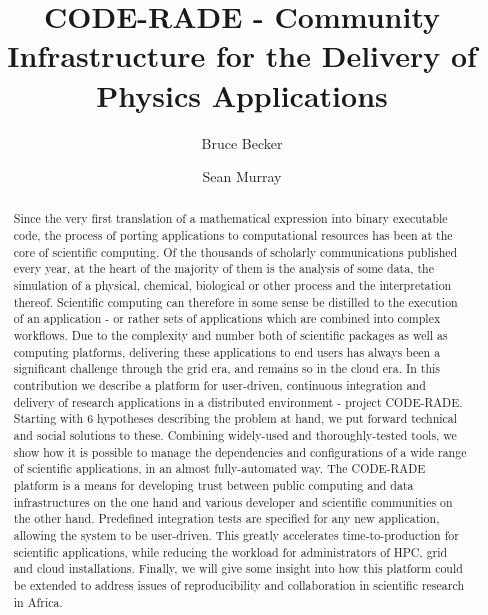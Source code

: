 \documentclass[a4paper]{jpconf}
\begin{document}
\title{CODE-RADE - Community Infrastructure for the Delivery of Physics Applications}

\author{Bruce Becker}
\address{C.S.I.R. Building 43 \\ 1 Meiring Naude Road \\ Brummeria \\ Pretoria \\ 0001}

\author{Sean Murray}
\address{C.H.P.C. \\ Rosebank \\ Cape Town \\ 7700}


\begin{abstract}
	Since the very first translation of a mathematical expression into binary executable code, the process of porting applications to computational resources has been at the core of scientific computing. Of the thousands of scholarly communications published every year, at the heart of the majority of them is the analysis of some data, the simulation of a physical, chemical, biological or other process and the interpretation thereof. Scientific computing can therefore in some sense be distilled to the execution of an application - or rather sets of applications which are combined into complex workflows. Due to the complexity and number both of scientific packages as well as computing platforms, delivering these applications to end users has always been a significant challenge through the grid era, and remains so in the cloud era. In this contribution we describe a platform for user-driven, continuous integration and delivery of research applications in a distributed environment - project CODE-RADE. Starting with 6 hypotheses describing the problem at hand, we put forward technical and social solutions to these. Combining widely-used and thoroughly-tested tools, we show how it is possible to manage the dependencies and configurations of a wide range of scientific applications, in an almost fully-automated way. The CODE-RADE platform is a means for developing trust between public computing and data infrastructures on the one hand and various developer and scientific communities on the other hand. Predefined integration tests are specified for any new application, allowing the system to be user-driven. This greatly accelerates time-to-production for scientific applications, while reducing the workload for administrators of HPC, grid and cloud installations. Finally, we will give some insight into how this platform could be extended to address issues of reproducibility and collaboration in scientific research in Africa.
\end{abstract}
\end{document}
